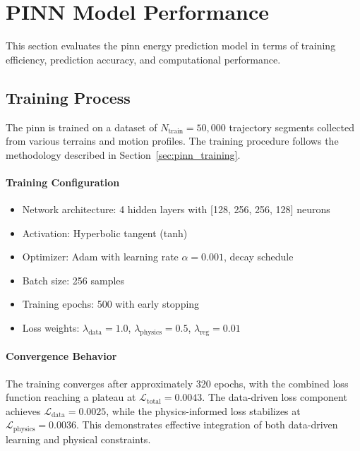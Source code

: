 \section{PINN Model Performance}
\label{sec:pinn_performance}

This section evaluates the \acrshort{pinn} energy prediction model in terms of training efficiency, prediction accuracy, and computational performance.

\subsection{Training Process}

The \acrshort{pinn} is trained on a dataset of $N_{\text{train}} = 50{,}000$ trajectory segments collected from various terrains and motion profiles. The training procedure follows the methodology described in Section~\ref{sec:pinn_training}.

\paragraph{Training Configuration}
\begin{itemize}
    \item Network architecture: 4 hidden layers with [128, 256, 256, 128] neurons
    \item Activation: Hyperbolic tangent (tanh)
    \item Optimizer: Adam with learning rate $\alpha = 0.001$, decay schedule
    \item Batch size: 256 samples
    \item Training epochs: 500 with early stopping
    \item Loss weights: $\lambda_{\text{data}} = 1.0$, $\lambda_{\text{physics}} = 0.5$, $\lambda_{\text{reg}} = 0.01$
\end{itemize}


\paragraph{Convergence Behavior}
The training converges after approximately 320 epochs, with the combined loss function reaching a plateau at $\mathcal{L}_{\text{total}} = 0.0043$. The data-driven loss component achieves $\mathcal{L}_{\text{data}} = 0.0025$, while the physics-informed loss stabilizes at $\mathcal{L}_{\text{physics}} = 0.0036$. This demonstrates effective integration of both data-driven learning and physical constraints.


